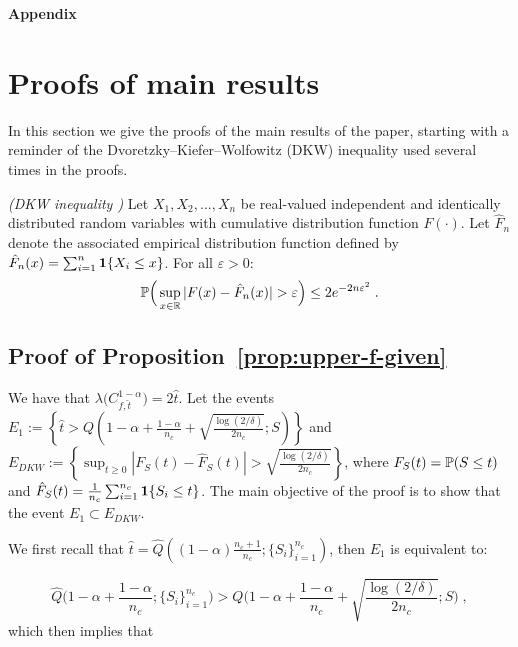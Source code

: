 
\begin{center}
    {\Large\textbf{Appendix}}
\end{center}

\section{Proofs of main results}

In this section we give the proofs of the main results of the paper, starting with a reminder of the Dvoretzky–Kiefer–Wolfowitz (DKW) inequality used several times in the proofs.

\begin{lemma}\emph{(DKW inequality \citep{dvoretzky1956asymptotic,massart1990tight})} \label{lem:DKW} Let $X_1, X_2,\ldots, X_n$ be real-valued independent and identically distributed random variables with cumulative distribution function $F(\cdot)$. Let $\hat{F}_n$ denote the associated empirical distribution function defined by $\hat{F}_n(x) = \sum_{i=1}^n\mathbf{1}\{X_i\leq x\}$. For all $\varepsilon > 0$:
%
\begin{equation*}
    {\mathbb{P}}\Big(\sup_{x \in{\mathbb{R}}}  |F(x) - \hat{F}_n(x)| > \varepsilon \Big) \leq 2e^{-2n\varepsilon^2} \; .
\end{equation*}
\end{lemma}

\subsection{Proof of Proposition~\ref{prop:upper-f-given}}
\label{app:proof-prop}



    We have that $\lambda\Big(C^{1-\alpha}_{f,\hat{t}}\Big) = 2\hat{t}$. Let the events $E_1:=\left\{\hat{t} > Q\left(1-\alpha + \frac{1-\alpha}{n_c} + \sqrt{\frac{\log(2/\delta)}{2n_c}}; S\right)\right\}$ and $E_{DKW}:=\left\{\sup_{t\geq 0}  |F_S(t) - \hat{F}_S(t)| >\sqrt{\frac{\log(2/\delta)}{2n_c}}\right\}$, 
    where $F_S(t) = {\mathbb{P}}(S\leq t)$ and $\hat{F}_S(t) = \frac{1}{n_c}\sum_{i=1}^{n_c}\mathbf{1}\{S_i\leq t\}$. The main objective of the proof is to show that the event $E_1  \subset E_{DKW}$.
    
    We first recall that $\hat{t} = \widehat{Q}((1-\alpha)\frac{n_c+1}{n_c};\{S_i\}_{i=1}^{n_c})$, then $E_1$ is equivalent to:

    \begin{equation*}
        \widehat{Q}\Big(1-\alpha + \frac{1-\alpha}{n_c};\{S_i\}_{i=1}^{n_c}\Big) > Q\Big(1-\alpha + \frac{1-\alpha}{n_c} + \sqrt{\frac{\log(2/\delta)}{2n_c}}; S\Big)\;,
    \end{equation*}
    which then implies that

